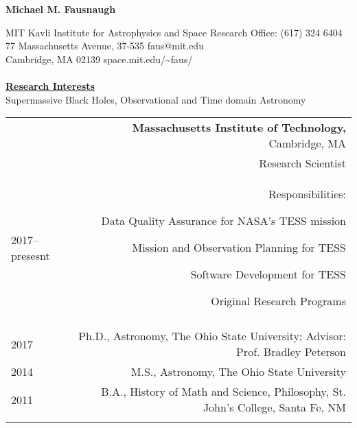 \documentclass[letterpaper,12pt]{article}
\begin{document}
\begin{center}
\huge\bfseries{Michael M. Fausnaugh}
\end{center}

\noindent MIT Kavli Institute for Astrophysics and Space Research \hfill Office: (617) 324 6404 \\
77 Massachusetts Avenue, 37-535  \hfill faus@mit.edu\\
Cambridge, MA 02139 \hfill space.mit.edu/\textasciitilde faus/
\\
\\
\underline{\textbf{Research Interests}}\\
Supermassive Black Holes, Observational and Time domain Astronomy
\\

\begin{longtable}{LR}

  \underline{} 
  &\textbf{Massachusetts Institute of Technology,} Cambridge, MA\\
  \underline{} & Research Scientist \\
  2017--presesnt & Responsibilities: \begin{compactitem}
   \item Data Quality Assurance for NASA's TESS mission
   \item Mission and Observation Planning for TESS
   \item Software Development for TESS
   \item Original Research Programs
   \end{compactitem}	
  \\
\underline{} &     \\
2017   &    Ph.D., Astronomy, The Ohio State University;  Advisor:  Prof. Bradley Peterson\\
2014 &    M.S.,  Astronomy, The Ohio State University\\
2011&B.A., History of Math and Science, Philosophy, St. John's College, Santa Fe, NM\\
\\


\end{longtable}
\end{document}
